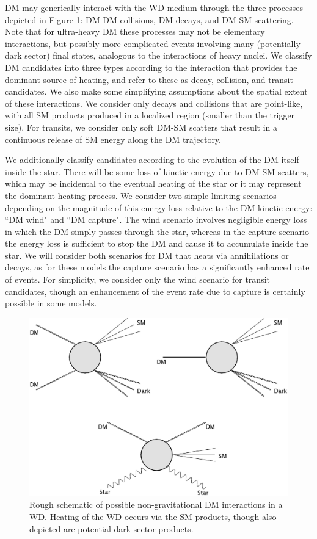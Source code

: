 \documentclass[twocolumn, preprintnumbers,amsmath,amssymb,prd, superscriptaddress]{revtex4}
\begin{document}
DM may generically interact with the WD medium through the three processes depicted in Figure \ref{fig:feynman}: DM-DM collisions, DM decays, and DM-SM scattering.
Note that for ultra-heavy DM these processes may not be elementary interactions, but possibly more complicated events involving many (potentially dark sector) final states, analogous to the interactions of heavy nuclei.
We classify DM candidates into three types according to the interaction that provides the dominant source of heating, and refer to these as decay, collision, and transit candidates.
We also make some simplifying assumptions about the spatial extent of these interactions.
We consider only decays and collisions that are point-like, with all SM products produced in a localized region (smaller than the trigger size).
For transits, we consider only soft DM-SM scatters that result in a continuous release of SM energy along the DM trajectory.

We additionally classify candidates according to the evolution of the DM itself inside the star.
There will be some loss of kinetic energy due to DM-SM scatters, which may be incidental to the eventual heating of the star or it may represent the dominant heating process.
We consider two simple limiting scenarios depending on the magnitude of this energy loss relative to the DM kinetic energy: ``DM wind" and ``DM capture".
The wind scenario involves negligible energy loss in which the DM simply passes through the star, whereas in the capture scenario the energy loss is sufficient to stop the DM and cause it to accumulate inside the star.
We will consider both scenarios for DM that heats via annihilations or decays, as for these models the capture scenario has a significantly enhanced rate of events.
For simplicity, we consider only the wind scenario for transit candidates, though an enhancement of the event rate due to capture is certainly possible in some models.

\begin{figure}
\includegraphics[scale=0.09]{feynmandiag.jpg}
\caption{Rough schematic of possible non-gravitational DM interactions in a WD. Heating of the WD occurs via the SM products, though also depicted are potential dark sector products.}
\label{fig:feynman}
\end{figure}
\end{document}
